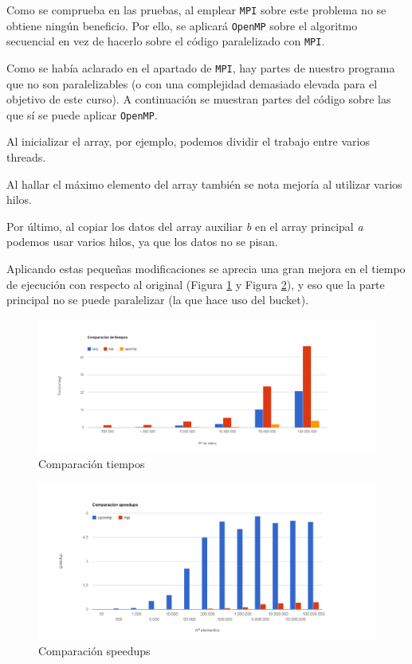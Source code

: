 Como se comprueba en las pruebas, al emplear \texttt{MPI} sobre este problema no se obtiene ningún beneficio. Por ello, se aplicará \texttt{OpenMP} sobre el algoritmo secuencial en vez de hacerlo sobre el código paralelizado con \texttt{MPI}.

Como se había aclarado en el apartado de \texttt{MPI}, hay partes de nuestro programa que no son paralelizables (o con una complejidad demasiado elevada para el objetivo de este curso). A continuación se muestran partes del código sobre las que sí se puede aplicar \texttt{OpenMP}.

Al inicializar el array, por ejemplo, podemos dividir el trabajo entre varios threads.


Al hallar el máximo elemento del array también se nota mejoría al utilizar varios hilos.


Por último, al copiar los datos del array auxiliar \emph{b} en el array principal \emph{a} podemos usar varios hilos, ya que los datos no se pisan.



Aplicando estas pequeñas modificaciones se aprecia una gran mejora en el tiempo de ejecución con respecto al original (Figura \ref{Comparacion_tiempos} y Figura \ref{Comparacion_speedups}), y eso que la parte principal no se puede paralelizar (la que hace uso del bucket).

\begin{figure}[h!]
	\centering
	\includegraphics[width=1.3\textwidth]{./res/Comparacion_tiempos}
	\caption{Comparación tiempos}
	\label{Comparacion_tiempos}
\end{figure}

\begin{figure}[h!]
	\centering
	\includegraphics[width=1.3\textwidth]{./res/Comparacion_speedups}
	\caption{Comparación speedups}
	\label{Comparacion_speedups}
\end{figure}